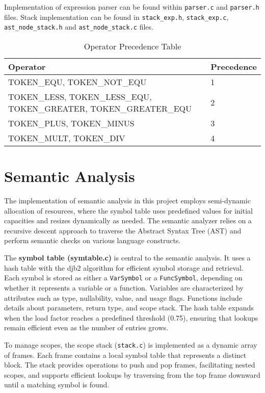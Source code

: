 \documentclass[12pt,a4paper]{article}
\begin{document}
Implementation of expression parser can be found within \texttt{parser.c} and \texttt{parser.h} files. Stack implementation can be found in \texttt{stack\_exp.h}, \texttt{stack\_exp.c}, \texttt{ast\_node\_stack.h} and \texttt{ast\_node\_stack.c} files.

\begin{table}[ht]
\centering
\begin{tabular}{|>{\raggedright\arraybackslash}p{6cm}|p{3cm}|}
\hline
\textbf{Operator} & \textbf{Precedence} \\
\hline
TOKEN\_EQU, TOKEN\_NOT\_EQU & 1 \\
\hline
TOKEN\_LESS, TOKEN\_LESS\_EQU, TOKEN\_GREATER, TOKEN\_GREATER\_EQU & 2 \\
\hline
TOKEN\_PLUS, TOKEN\_MINUS & 3 \\
\hline
TOKEN\_MULT, TOKEN\_DIV & 4 \\
\hline
\end{tabular}
\caption{Operator Precedence Table}
\end{table}

\section{Semantic Analysis\cite{djb2}}

The implementation of semantic analysis in this project employs semi-dynamic allocation of resources, where the symbol table uses predefined values for initial capacities and resizes dynamically as needed. The semantic analyzer relies on a recursive descent approach to traverse the Abstract Syntax Tree (AST) and perform semantic checks on various language constructs.

The \textbf{symbol table (symtable.c)} is central to the semantic analysis. It uses a hash table with the djb2 algorithm for efficient symbol storage and retrieval. Each symbol is stored as either a \texttt{VarSymbol} or a \texttt{FuncSymbol}, depending on whether it represents a variable or a function. Variables are characterized by attributes such as type, nullability, value, and usage flags. Functions include details about parameters, return type, and scope stack. The hash table expands when the load factor reaches a predefined threshold (0.75), ensuring that lookups remain efficient even as the number of entries grows.

To manage scopes, the scope stack (\texttt{stack.c}) is implemented as a dynamic array of frames. Each frame contains a local symbol table that represents a distinct block. The stack provides operations to push and pop frames, facilitating nested scopes, and supports efficient lookups by traversing from the top frame downward until a matching symbol is found.
\end{document}
